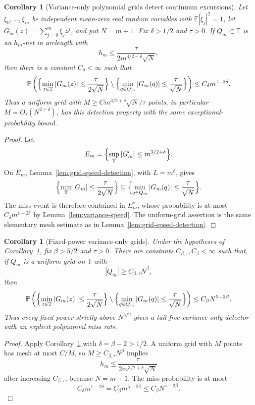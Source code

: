 \documentclass[11pt]{amsart}
\numberwithin{equation}{section}
\newtheorem{corollary}[theorem]{Corollary}
\theoremstyle{definition}
\theoremstyle{remark}
\newcommand{\T}{\mathbb T}
\newcommand{\Prob}{\mathbb P}
\newcommand{\Exp}{\mathbb E}
\newcommand{\abs}[1]{\left\lvert #1\right\rvert}
\begin{document}
\begin{corollary}[Variance-only polynomial grids detect continuum excursions]
\label{cor:variance-grid-detects}
Let \(\xi_0,\ldots,\xi_m\) be independent mean-zero real random variables with
\(\Exp|\xi_j|^2=1\), let \(G_m(z)=\sum_{j=0}^m\xi_jz^j\), and put \(N=m+1\).
Fix \(\delta>1/2\) and \(\tau>0\).  If \(Q_m\subset\T\) is an \(h_m\)-net in
arclength with
\[
  h_m\le \frac{\tau}{2m^{3/2+\delta}\sqrt N},
\]
then there is a constant \(C_\delta<\infty\) such that
\[
  \Prob\left(
    \Bigl\{\min_{z\in\T}\abs{G_m(z)}\le \frac{\tau}{2\sqrt N}\Bigr\}
    \setminus
    \Bigl\{\min_{q\in Q_m}\abs{G_m(q)}\le \frac{\tau}{\sqrt N}\Bigr\}
  \right)
  \le C_\delta m^{1-2\delta}.
\]
Thus a uniform grid with \(M\ge C m^{3/2+\delta}\sqrt N/\tau\) points, in
particular \(M=O_\tau(N^{2+\delta})\), has this detection property with the
same exceptional-probability bound.
\end{corollary}

\begin{proof}
Let
\[
  E_m=\Bigl\{\sup_{\T}\abs{G_m'}\le m^{3/2+\delta}\Bigr\}.
\]
On \(E_m\), Lemma~\ref{lem:grid-speed-detection}, with \(L=m^\delta\), gives
\[
  \Bigl\{\min_{\T}\abs{G_m}\le \frac{\tau}{2\sqrt N}\Bigr\}
  \subseteq
  \Bigl\{\min_{q\in Q_m}\abs{G_m(q)}\le \frac{\tau}{\sqrt N}\Bigr\}.
\]
The miss event is therefore contained in \(E_m^c\), whose probability is
at most \(C_\delta m^{1-2\delta}\) by Lemma~\ref{lem:variance-speed}.  The
uniform-grid assertion is the same elementary mesh estimate as in
Lemma~\ref{lem:grid-speed-detection}.
\end{proof}

\begin{corollary}[Fixed-power variance-only grids]
\label{cor:variance-grid-fixed-power}
Under the hypotheses of Corollary~\ref{cor:variance-grid-detects}, fix
\(\beta>5/2\) and \(\tau>0\).  There are constants
\(C_{\beta,\tau},C_\beta<\infty\) such that, if \(Q_m\) is a uniform grid on
\(\T\) with
\[
  |Q_m|\ge C_{\beta,\tau}N^\beta ,
\]
then
\[
  \Prob\left(
    \Bigl\{\min_{z\in\T}\abs{G_m(z)}\le \frac{\tau}{2\sqrt N}\Bigr\}
    \setminus
    \Bigl\{\min_{q\in Q_m}\abs{G_m(q)}\le \frac{\tau}{\sqrt N}\Bigr\}
  \right)
  \le C_\beta N^{5-2\beta}.
\]
Thus every fixed power strictly above \(N^{5/2}\) gives a tail-free
variance-only detector with an explicit polynomial miss rate.
\end{corollary}

\begin{proof}
Apply Corollary~\ref{cor:variance-grid-detects} with
\(\delta=\beta-2>1/2\).  A uniform grid with \(M\) points has mesh at most
\(C/M\), so \(M\ge C_{\beta,\tau}N^\beta\) implies
\[
  h_m\le \frac{\tau}{2m^{3/2+\delta}\sqrt N}
\]
after increasing \(C_{\beta,\tau}\), because \(N=m+1\).  The miss probability
is at most
\[
  C_\delta m^{1-2\delta}=C_\beta m^{5-2\beta}\le C_\beta N^{5-2\beta}.
\]
\end{proof}
\end{document}

